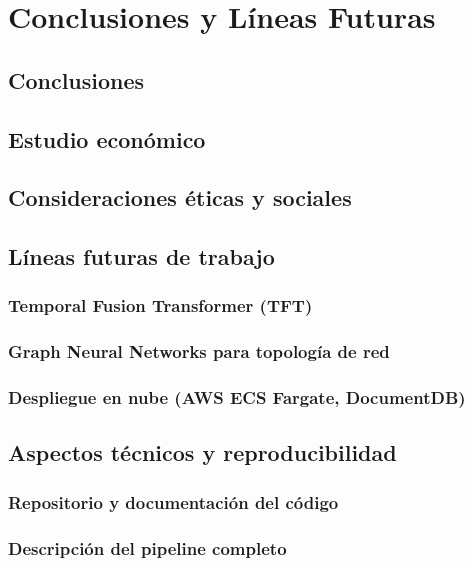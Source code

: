 \documentclass[12pt, a4paper]{article}
\begin{document}
\section{Conclusiones y Líneas Futuras}


\subsection{Conclusiones}


\subsection{Estudio económico}


\subsection{Consideraciones éticas y sociales}


\subsection{Líneas futuras de trabajo}


\subsubsection{Temporal Fusion Transformer (TFT)}


\subsubsection{Graph Neural Networks para topología de red}


\subsubsection{Despliegue en nube (AWS ECS Fargate, DocumentDB)}


\subsection{Aspectos técnicos y reproducibilidad}


\subsubsection{Repositorio y documentación del código}


\subsubsection{Descripción del pipeline completo}
\end{document}
